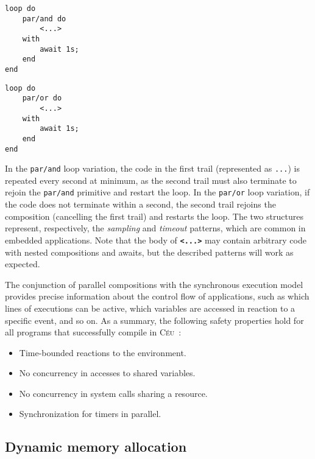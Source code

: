 \documentclass[pdftex,12pt,a4paper]{article}
\newcommand{\CEU}{\textsc{C\'{e}u}\xspace}
\newcommand{\code}[1] {{\small{\texttt{#1}}}}
\begin{document}
\begin{minipage}[t]{0.35\linewidth}
\begin{lstlisting}
loop do
    par/and do
        <...>
    with
        await 1s;
    end
end
\end{lstlisting}
\end{minipage}
%
\hspace{1cm}
%
\begin{minipage}[t]{0.35\linewidth}
\begin{lstlisting}
loop do
    par/or do
        <...>
    with
        await 1s;
    end
end
\end{lstlisting}
\end{minipage}

In the \code{par/and} loop variation, the code in the first trail (represented 
as \code{...}) is repeated every second at minimum, as the second trail must 
also terminate to rejoin the \code{par/and} primitive and restart the loop.
%
In the \code{par/or} loop variation, if the code does not terminate within a 
second, the second trail rejoins the composition (cancelling the first trail) 
and restarts the loop.
%
The two structures represent, respectively, the \emph{sampling} and 
\emph{timeout} patterns, which are common in embedded applications.
%
Note that the body of \textbf{\code{<...>}} may contain arbitrary code with 
nested compositions and awaits, but the described patterns will work as 
expected.

The conjunction of parallel compositions with the synchronous execution model 
provides precise information about the control flow of applications, such as 
which lines of executions can be active, which variables are accessed in 
reaction to a specific event, and so on.
%
As a summary, the following safety properties hold for all programs that 
successfully compile in \CEU~\cite{ceu.sensys13}:
%
\begin{itemize}
\item Time-bounded reactions to the environment.
\item No concurrency in accesses to shared variables.
\item No concurrency in system calls sharing a resource.
\item Synchronization for timers in parallel.
\end{itemize}

\subsection{Dynamic memory allocation}
\end{document}
